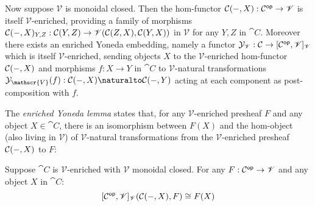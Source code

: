 \noindent Now suppose $\mathscr{V}$ is monoidal closed. Then the hom-functor ${\mathcal{C}}(-,X): \mathcal{C}^{\mathsf{op}}
\to \mathscr{V}$ is itself $\mathscr{V}$-enriched, providing a family of morphisms ${\mathcal{C}}(-,X)_{Y,Z}:
{\mathcal{C}}(Y,Z) \to {\mathscr{V}}({\mathcal{C}}(Z,X),{\mathcal{C}}(Y,X))$ in $\mathscr{V}$ for any
$Y, Z$ in $\cat{C}$. Moreover there exists an enriched Yoneda embedding, namely a functor
$\mathcal{Y}_{\mathscr{V}}: \mathcal{C} \to [\mathcal{C}^{\mathsf{op}},\mathscr{V}]_{\mathscr{V}}$ which is itself
$\mathscr{V}$-enriched, sending objects $X$ to the $\mathscr{V}$-enriched hom-functor ${\mathcal{C}}(-,X)$
and morphisms $f: X \to Y$ in $\cat{C}$ to $\mathscr{V}$-natural transformations $\Yoneda_{\mathscr{V}}(f):
\Hom{\cat{C}}{-}{X} \naturalto \Hom{\cat{C}}{-}{Y}$ acting at each component as post-composition with $f$.

The \emph{enriched Yoneda lemma} states that, for any $\mathscr{V}$-enriched presheaf $F$ and any object $X
\in \cat{C}$, there is an isomorphism between $F(X)$ and the hom-object (also living in $\mathscr{V}$) of
$\mathscr{V}$-natural transformations from the $\mathscr{V}$-enriched presheaf ${\mathcal{C}}(-,X)$ to $F$:

\begin{lemma}
Suppose $\cat{C}$ is $\mathscr{V}$-enriched with $\mathscr{V}$ monoidal closed. For any $F: \mathcal{C}^{\mathsf{op}} \to
\mathscr{V}$ and any object $X$ in $\cat{C}$:
\[{[\mathcal{C}^{\mathsf{op}},\mathscr{V}]_{\mathscr{V}}}({\mathcal{C}}(-,X),F) \cong F(X)\]
\end{lemma}


%
%
%
